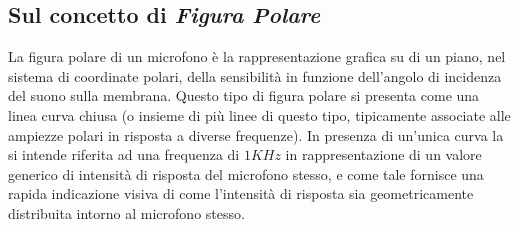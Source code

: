 \begin{refsection}
%
%
%

\subsection{Sul concetto di \emph{Figura Polare}}
\label{sec:polarplot}

La figura polare di un microfono è la rappresentazione grafica su di un piano,
nel sistema di coordinate polari, della sensibilità in funzione dell'angolo di
incidenza del suono sulla membrana. Questo tipo di figura polare si presenta
come una linea curva chiusa (o insieme di più linee di questo tipo, tipicamente
associate alle ampiezze polari in risposta a diverse frequenze). In presenza di
un’unica curva la si intende riferita ad una frequenza di $1KHz$ in rappresentazione
di un valore generico di intensità di risposta del microfono stesso,
e come tale fornisce una rapida indicazione visiva di come l'intensità di
risposta sia geometricamente distribuita intorno
al microfono stesso.


\end{refsection}
